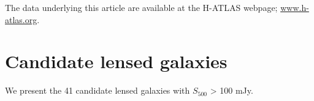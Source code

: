 \documentclass[fleqn,usenatbib]{mnras}
\begin{document}
The data underlying this article are available at the H-ATLAS webpage; \url{www.h-atlas.org}.









\appendix

\section{Candidate lensed galaxies}

We present the 41 candidate lensed galaxies with $S_{500}$ > 100 mJy. 
\end{document}
